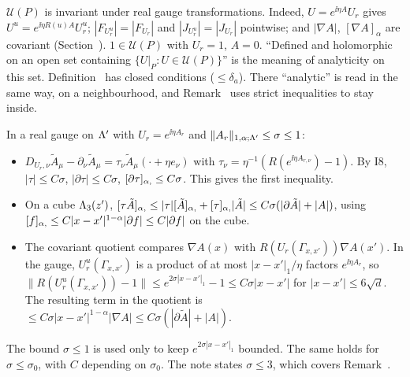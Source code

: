\begin{detail}\label{d8:covflat}
\begin{step}
$\mathcal U(P)$ is invariant under real gauge transformations. Indeed, $U=e^{\ii\eta A}U_r$ gives $U^u=e^{\ii\eta R(u)A}U_r^u$; $|F_{U_r^u}|=|F_{U_r}|$ and $|J_{U_r^u}|=|J_{U_r}|$ pointwise; and $|\nabla A|$, $[\nabla A]_\alpha$ are covariant (Section~). $1\in\mathcal U(P)$ with $U_r=1$, $A=0$. ``Defined and holomorphic on an open set containing $\{U|_P:U\in\mathcal U(P)\}$'' is the meaning of analyticity on this set. Definition~ has closed conditions ($\le\delta_a$). There ``analytic'' is read in the same way, on a neighbourhood, and Remark~ uses strict inequalities to stay inside.
\end{step}
\begin{step}
In a real gauge on $\Lambda'$ with $U_r=e^{\ii\eta A_r}$ and $\|A_r\|_{1,\alpha;\Lambda'}\le\sigma\le1$:
\begin{itemize}
\item $D_{U_r,\nu}\tilde A_\mu-\partial_\nu\tilde A_\mu=\tau_\nu\tilde A_\mu(\cdot+\eta e_\nu)$ with $\tau_\nu=\eta^{-1}(R(e^{\ii\eta A_{r,\nu}})-1)$. By I8, $|\tau|\le C\sigma$, $|\partial\tau|\le C\sigma$, $[\partial\tau]_{\alpha,}\le C\sigma$. This gives the first inequality.
\item On a cube $\Lambda_3(z')$, $[\tau\tilde A]_{\alpha,}\le|\tau|[\tilde A]_{\alpha,}+[\tau]_{\alpha,}|\tilde A|\le C\sigma(|\partial\tilde A|+|A|)$, using $[f]_{\alpha,}\le C|x-x'|^{1-\alpha}|\partial f|\le C|\partial f|$ on the cube.
\item The covariant quotient compares $\nabla A(x)$ with $R(U_r(\Gamma_{x,x'}))\nabla A(x')$. In the gauge, $U_r^u(\Gamma_{x,x'})$ is a product of at most $|x-x'|_1/\eta$ factors $e^{\ii\eta A_r}$, so $\|R(U_r^u(\Gamma_{x,x'}))-1\|\le e^{2\sigma|x-x'|_1}-1\le C\sigma|x-x'|$ for $|x-x'|\le6\sqrt d$. The resulting term in the quotient is $\le C\sigma|x-x'|^{1-\alpha}|\nabla A|\le C\sigma(|\partial\tilde A|+|A|)$.
\end{itemize}
The bound $\sigma\le1$ is used only to keep $e^{2\sigma|x-x'|_1}$ bounded. The same holds for $\sigma\le\sigma_0$, with $C$ depending on $\sigma_0$. The note states $\sigma\le3$, which covers Remark~.
\end{step}
\end{detail}

